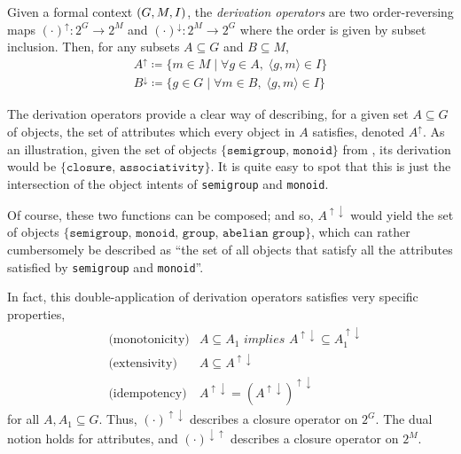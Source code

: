 \begin{definition}
  \label{definition:derivation-operators}
  Given a formal context $(G,M,I)$, the \textit{derivation operators} are two order-reversing maps $(\cdot)^\uparrow : 2^G \to 2^M$ and $(\cdot)^\downarrow : 2^M \to 2^G$ where the order is given by subset inclusion. Then, for any subsets $A \subseteq G$ and $B \subseteq M$,
  \begin{align*}
    A^\uparrow \coloneqq \{m \in M \mid \forall g \in A, \; \langle g,m \rangle \in I\} \\
    B^\downarrow \coloneqq \{g \in G \mid \forall m \in B, \; \langle g,m \rangle \in I\}
  \end{align*}
\end{definition}

The derivation operators provide a clear way of describing, for a given set $A\subseteq G$ of objects, the set of attributes which every object in $A$ satisfies, denoted $A^\uparrow$. As an illustration, given the set of objects $\{\texttt{semigroup, monoid}\}$ from , its derivation would be $\{\texttt{closure, associativity}\}$. It is quite easy to spot that this is just the intersection of the object intents of \texttt{semigroup} and \texttt{monoid}.

Of course, these two functions can be composed; and so, $A^{\uparrow \downarrow}$ would yield the set of objects $\{\texttt{semigroup, monoid, group, abelian group}\}$, which can rather cumbersomely be described as ``the set of all  objects that satisfy all the attributes satisfied by \texttt{semigroup} and \texttt{monoid}''.


In fact, this double-application of derivation operators satisfies very specific properties,
\begin{align}
  & \text{(monotonicity)} & A \subseteq A_1 \textit{ implies } A^{\uparrow \downarrow} \subseteq A_1^{\uparrow \downarrow} \\
  & \text{(extensivity)}  & A \subseteq A^{\uparrow \downarrow} \\
  & \text{(idempotency)}  & A^{\uparrow \downarrow} = (A^{\uparrow \downarrow})^{\uparrow \downarrow}
\end{align}
for all $A, A_1 \subseteq G$. Thus, $(\cdot)^{\uparrow \downarrow}$ describes a closure operator on $2^G$. The dual notion holds for attributes, and $(\cdot)^{\downarrow \uparrow}$ describes a closure operator on $2^M$.


